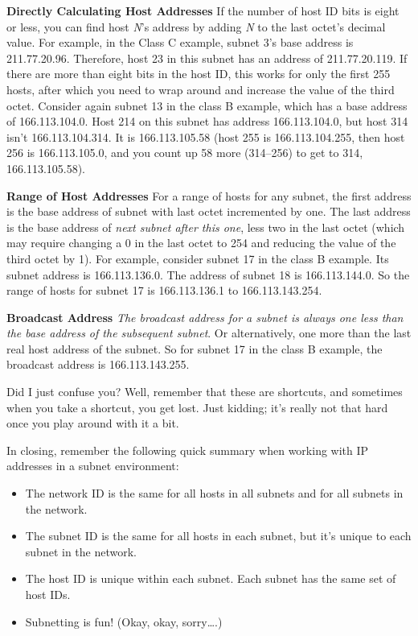 {\textbf{Directly Calculating Host Addresses}} If the number of host ID
bits is eight or less, you can find host {\emph{N}}'s address by adding
{\emph{N}} to the last octet's decimal value. For example, in the Class
C example, subnet 3's base address is 211.77.20.96. Therefore, host 23
in this subnet has an address of 211.77.20.119. If there are more than
eight bits in the host ID, this works for only the first 255 hosts,
after which you need to wrap around and increase the value of the third
octet. Consider again subnet 13 in the class B example, which has a base
address of 166.113.104.0. Host 214 on this subnet has address
166.113.104.0, but host 314 isn't 166.113.104.314. It is 166.113.105.58
(host 255 is 166.113.104.255, then host 256 is 166.113.105.0, and you
count up 58 more (314--256) to get to 314, 166.113.105.58).

{\textbf{Range of Host Addresses}} For a range of hosts for any subnet,
the first address is the base address of subnet with last octet
incremented by one. The last address is the base address of {\emph{next
subnet after this one}}, less two in the last octet (which may require
changing a 0 in the last octet to 254 and reducing the value of the
third octet by 1). For example, consider subnet 17 in the class B
example. Its subnet address is 166.113.136.0. The address of subnet 18
is 166.113.144.0. So the range of hosts for subnet 17 is 166.113.136.1
to 166.113.143.254.

{\textbf{Broadcast Address}} {\emph{The broadcast address for a subnet
is always one less than the base address of the subsequent subnet}}. Or
alternatively, one more than the last real host address of the subnet.
So for subnet 17 in the class B example, the broadcast address is
166.113.143.255.

Did I just confuse you? Well, remember that these are shortcuts, and
sometimes when you take a shortcut, you get lost. Just kidding; it's
really not that hard once you play around with it a bit.

In closing, remember the following quick summary when working with IP
addresses in a subnet environment:

\begin{itemize}
\item
  The network ID is the same for all hosts in all subnets and for all
  subnets in the network.
\item
  The subnet ID is the same for all hosts in each subnet, but it's
  unique to each subnet in the network.
\item
  The host ID is unique within each subnet. Each subnet has the same set
  of host IDs.
\item
  Subnetting is fun! (Okay, okay, sorry\ldots.)
\end{itemize}



